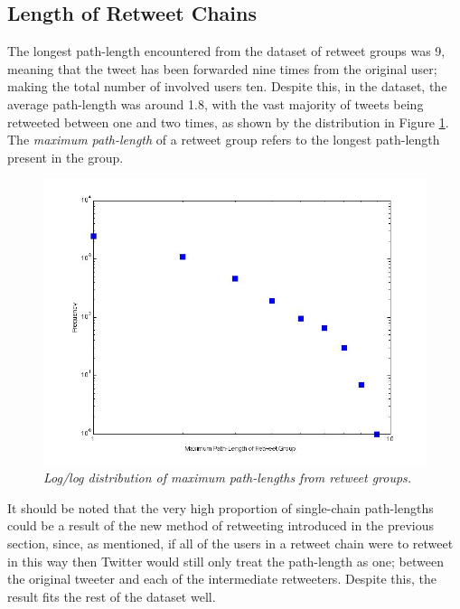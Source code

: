 \subsection{Length of Retweet Chains}
\label{length of retweet chains}
The longest path-length encountered from the dataset of retweet groups was 9, meaning that the tweet has been forwarded nine times from the original user; making the total number of involved users ten. Despite this, in the dataset, the average path-length was around 1.8, with the vast majority of tweets being retweeted between one and two times, as shown by the distribution in Figure \ref{fig:pathlength-distribution}. The \textit{maximum path-length} of a retweet group refers to the longest path-length present in the group.\\
\begin{figure}[h]
\includegraphics[scale=0.35]{3.Chapter1/Media/pathlength-distribution.jpg} 
\caption{\textit{Log/log distribution of maximum path-lengths from retweet groups.}}
\label{fig:pathlength-distribution}
\end{figure}
It should be noted that the very high proportion of single-chain path-lengths could be a result of the new method of retweeting introduced in the previous section, since, as mentioned, if all of the users in a retweet chain were to retweet in this way then Twitter would still only treat the path-length as one; between the original tweeter and each of the intermediate retweeters. Despite this, the result fits the rest of the dataset well.\\
